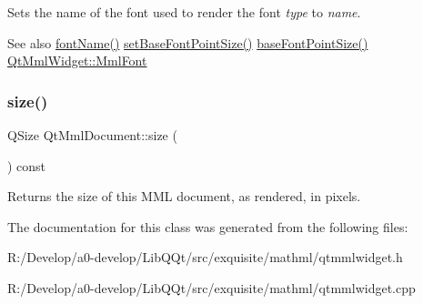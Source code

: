 Sets the name of the font used to render the font {\itshape type} to {\itshape name}.

\begin{DoxySeeAlso}{See also}
\mbox{\hyperlink{class_qt_mml_document_aee262410ce903f2a58c1eac22311266a}{font\+Name()}} \mbox{\hyperlink{class_qt_mml_document_aedb2bedfbc96f3fb41cd04ecf3f327f2}{set\+Base\+Font\+Point\+Size()}} \mbox{\hyperlink{class_qt_mml_document_a6988266de54f91cdc03e3d20915828c1}{base\+Font\+Point\+Size()}} \mbox{\hyperlink{class_qt_mml_widget_ac3fde39f7b605557d80bded69f985d2a}{Qt\+Mml\+Widget\+::\+Mml\+Font}} 
\end{DoxySeeAlso}
\mbox{\label{class_qt_mml_document_a01cd1b6f95f011fa3a9a9292e833528e}} 
\subsubsection{\texorpdfstring{size()}{size()}}
{\footnotesize\ttfamily Q\+Size Qt\+Mml\+Document\+::size (\begin{DoxyParamCaption}{ }\end{DoxyParamCaption}) const}

Returns the size of this M\+ML document, as rendered, in pixels. 

The documentation for this class was generated from the following files\+:\begin{DoxyCompactItemize}
\item 
R\+:/\+Develop/a0-\/develop/\+Lib\+Q\+Qt/src/exquisite/mathml/qtmmlwidget.\+h\item 
R\+:/\+Develop/a0-\/develop/\+Lib\+Q\+Qt/src/exquisite/mathml/qtmmlwidget.\+cpp\end{DoxyCompactItemize}
